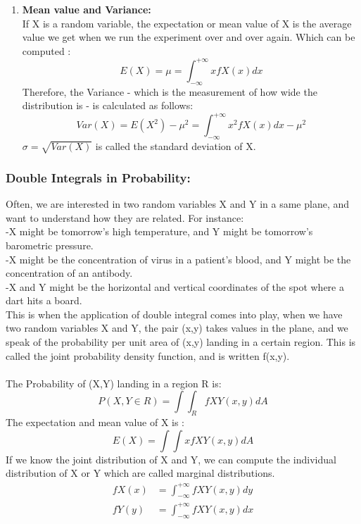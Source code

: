 \documentclass[a4paper]{article}
\begin{document}
\begin{enumerate}
		\item \textbf{Mean value and Variance:} \\
		If X is a random variable, the expectation or mean value of X is the average value we get when we run the experiment over and over again. Which can be computed : 
		\begin{equation*}
		E(X) = \mu =  \int_{-\infty}^{+\infty} xfX(x)dx
		\end{equation*}
		Therefore, the Variance - which is the measurement of how wide the distribution is - is calculated as follows:
		\begin{equation*}
		Var(X) = E(X^{2}) - \mu ^{2} = \int_{-\infty}^{+\infty} x^{2}fX(x)dx - \mu ^{2}
		\end{equation*}
		$\sigma = \sqrt{Var(X)}$ is called the standard deviation of X.
		
	\end{enumerate}
	\subsubsection*{Double Integrals in Probability:}
	Often, we are interested in two random variables X and Y in a same plane, and want to understand how they are related. For instance: \\
	-X might be tomorrow's high temperature, and Y might be tomorrow's barometric pressure. \\
	-X might be the concentration of virus in a patient's blood, and Y might be the concentration of an antibody. \\
	-X and Y might be the horizontal and vertical coordinates of the spot where a dart hits a board. \\
	This is when the application of double integral comes into play, when we have two random variables X and Y, the pair (x,y) takes values in the plane, and we speak of the probability per unit area of (x,y) landing in a certain region. This is called the joint probability density function, and is written f(x,y). \\ \\
	The Probability of (X,Y) landing in a region R is:
	\begin{equation*}
	P(X,Y \in R ) = \int \int_{R} f X Y(x,y) dA
	\end{equation*}
	The expectation and mean value of X is :
	\begin{equation*}
	E(X) = \int \int xf X Y(x,y) dA
	\end{equation*}
	If we know the joint distribution of X and Y, we can compute the individual distribution of  X or Y which are called marginal distributions.
	\begin{align*}
	fX(x) &=  \int_{-\infty}^{+ \infty} fXY(x,y) dy \\
	fY(y) &=  \int_{-\infty}^{+ \infty} fXY(x,y) dx \\
	\end{align*}
\end{document}

